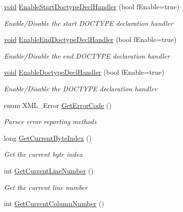 \begin{DoxyCompactItemize}
\hyperlink{_cpclient_8h_a6464f7480a0fd0ee170cba12b2c0497f}{void} \hyperlink{class_c_expat_impl_a1294cb39e231da87e282eb84196c8785}{\-Enable\-Start\-Doctype\-Decl\-Handler} (bool f\-Enable=true)
\begin{DoxyCompactList}\small\item\em \-Enable/\-Disable the start \-D\-O\-C\-T\-Y\-P\-E declaration handler \end{DoxyCompactList}\item 
\hyperlink{_cpclient_8h_a6464f7480a0fd0ee170cba12b2c0497f}{void} \hyperlink{class_c_expat_impl_a6fcf5de29a3e7a3da9ca655eb91b115c}{\-Enable\-End\-Doctype\-Decl\-Handler} (bool f\-Enable=true)
\begin{DoxyCompactList}\small\item\em \-Enable/\-Disable the end \-D\-O\-C\-T\-Y\-P\-E declaration handler \end{DoxyCompactList}\item 
\hyperlink{_cpclient_8h_a6464f7480a0fd0ee170cba12b2c0497f}{void} \hyperlink{class_c_expat_impl_a267c2e407879948b0b3910ccc84e7815}{\-Enable\-Doctype\-Decl\-Handler} (bool f\-Enable=true)
\begin{DoxyCompactList}\small\item\em \-Enable/\-Disable the \-D\-O\-C\-T\-Y\-P\-E declaration handler \end{DoxyCompactList}\item 
enum \-X\-M\-L\-\_\-\-Error \hyperlink{class_c_expat_impl_aeb0f6e67c9ab6fdfeb299f48d8445837}{\-Get\-Error\-Code} ()
\begin{DoxyCompactList}\small\item\em \-Parser error reporting methods \end{DoxyCompactList}\item 
long \hyperlink{class_c_expat_impl_ab19268d1441402b98ec8ccab31cb2015}{\-Get\-Current\-Byte\-Index} ()
\begin{DoxyCompactList}\small\item\em \-Get the current byte index \end{DoxyCompactList}\item 
int \hyperlink{class_c_expat_impl_ab6ef6ce8ef73ed2a454f6375ab7b665f}{\-Get\-Current\-Line\-Number} ()
\begin{DoxyCompactList}\small\item\em \-Get the current line number \end{DoxyCompactList}\item 
int \hyperlink{class_c_expat_impl_aad097c9be6cd886a799eee992670d9de}{\-Get\-Current\-Column\-Number} ()

\end{DoxyCompactItemize}
